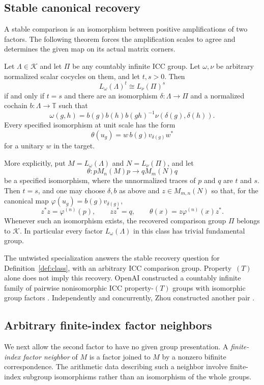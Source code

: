\subsection{Stable canonical recovery}
A stable comparison is an isomorphism between positive amplifications of
two factors. The following theorem forces the amplification scales to agree and
determines the given map on its actual matrix corners.

\begin{theorem}
\label{thm:stable}
Let $\Lambda\in\mathscr K$ and let $\Pi$ be any countably infinite ICC
group. Let $\omega,\nu$ be arbitrary normalized
scalar cocycles on them, and let $t,s>0$. Then
\[
 L_\omega(\Lambda)^t\cong L_\nu(\Pi)^s
\]
if and only if $t=s$ and there are an isomorphism $\delta:\Lambda\to\Pi$
and a normalized cochain $b:\Lambda\to\mathbb T$ such that
\begin{equation}\label{eq:intro-cochain}
 \omega(g,h)=b(g)b(h)b(gh)^{-1}\nu(\delta(g),\delta(h)).
\end{equation}
Every specified isomorphism at unit scale has the form
\[
 \theta(u_g)=w\,b(g)v_{\delta(g)}w^*
\]
for a unitary $w$ in the target.

More explicitly, put $M=L_\omega(\Lambda)$ and $N=L_\nu(\Pi)$, and let
\[
 \theta:pM_n(M)p\longrightarrow qM_m(N)q
\]
be a specified isomorphism, where the unnormalized traces of $p$ and $q$
are $t$ and $s$. Then $t=s$, and one may choose $\delta,b$ as above and
$z\in M_{m,n}(N)$ so that, for the canonical map
$\varphi(u_g)=b(g)v_{\delta(g)}$,
\[
 z^*z=\varphi^{(n)}(p),\qquad zz^*=q,
 \qquad \theta(x)=z\varphi^{(n)}(x)z^*.
\]
Whenever such an isomorphism exists, the recovered comparison group
$\Pi$ belongs to $\mathscr K$. In particular every factor
$L_\omega(\Lambda)$ in this class has trivial
fundamental group.
\end{theorem}

The untwisted specialization answers the stable recovery question for
Definition~\ref{def:class}, with an arbitrary ICC comparison group.
Property~$(T)$ alone does not imply this recovery. \mbox{OpenAI} constructed a countably
infinite family of pairwise nonisomorphic ICC property-$(T)$ groups with
isomorphic group factors \cite[Chapter~4, Theorem~1.2]{OpenAITenAdvances2026}.
Independently and concurrently, Zhou constructed another pair
\cite[Theorem~A]{Zhou2026}.

\subsection{Arbitrary finite-index factor neighbors}
We next allow the second factor to have no given group presentation.
A \emph{finite-index factor neighbor} of $M$ is a factor joined to $M$
by a nonzero bifinite correspondence. The arithmetic data describing such
a neighbor involve finite-index subgroup isomorphisms rather than an
isomorphism of the whole groups.

